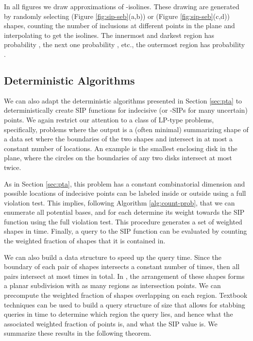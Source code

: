 \documentclass{journal}
\begin{document}
In all figures we draw approximations of -isolines.
These drawing are generated by randomly selecting  (Figure \ref{fig:sip-seb}(a,b)) or  (Figure \ref{fig:sip-seb}(c,d)) shapes, counting the number of inclusions at different points in the plane and interpolating to get the isolines.
  The innermost and darkest region has probability , the next one probability , etc., the outermost region has probability .





\subsection {Deterministic Algorithms}

We can also adapt the deterministic algorithms presented in Section \ref{sec:pta} to deterministically create SIP functions for indecisive (or -SIPs for many uncertain) points.  
We again restrict our attention to a class of LP-type problems, specifically, problems where the output is a (often minimal) summarizing shape  of a data set  where the boundaries of the two shapes  and  intersect in at most a constant number of locations.  An example is the smallest enclosing disk in the plane, where the circles on the boundaries of any two disks intersect at most twice.  

As in Section \ref{sec:pta}, this problem has a constant combinatorial dimension  and possible locations of indecisive points can be labeled inside or outside  using a full violation test.  This implies, following Algorithm \ref{alg:count-prob}, that we can enumerate all  potential bases, and for each determine its weight towards the SIP function using the full violation test.  This procedure generates a set of  weighted shapes in  time.  Finally, a query to the SIP function can be evaluated by counting the weighted fraction of shapes that it is contained in.  

We can also build a data structure to speed up the query time.  Since the boundary of each pair of shapes intersects a constant number of times, then all  pairs intersect at most  times in total.  In , the arrangement of these shapes forms a planar subdivision with as many regions as intersection points.  We can precompute the weighted fraction of shapes overlapping on each region.  Textbook techniques can be used to build a query structure of size  that allows for stabbing queries in time  to determine which region the query lies, and hence what the associated weighted fraction of points is, and what the SIP value is.  
We summarize these results in the following theorem.  
\end{document}
